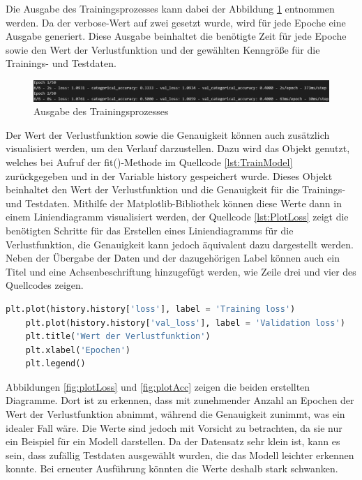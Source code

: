 Die Ausgabe des Trainingsprozesses kann dabei der Abbildung \ref*{fig:TrainModel} entnommen werden. Da der \glqq verbose\grqq{}-Wert auf zwei gesetzt wurde, wird für jede Epoche eine Ausgabe
generiert. Diese Ausgabe beinhaltet die benötigte Zeit für jede Epoche sowie den Wert der Verlustfunktion und der gewählten Kenngröße für die Trainings- und Testdaten.
\begin{figure}[H]
    \centering
    \includegraphics[width = \textwidth]{abbildungen/TrainAusgabe.png}
    \caption{Ausgabe des Trainingsprozesses}
    \label{fig:TrainModel}
\end{figure}
Der Wert der Verlustfunktion sowie die Genauigkeit können auch zusätzlich visualisiert werden, um den Verlauf darzustellen. Dazu wird das Objekt genutzt, welches bei Aufruf der 
fit()-Methode im Quellcode \ref*{lst:TrainModel} zurückgegeben und in der Variable \glqq history\grqq{} gespeichert wurde. Dieses Objekt beinhaltet 
den Wert der Verlustfunktion und die Genauigkeit für die Trainings- und Testdaten. Mithilfe der Matplotlib-Bibliothek können diese Werte dann in einem Liniendiagramm visualisiert werden,
der Quellcode \ref*{lst:PlotLoss} zeigt die benötigten Schritte für das Erstellen eines Liniendiagramms für die Verlustfunktion, die Genauigkeit kann jedoch äquivalent dazu 
dargestellt werden. Neben der Übergabe der Daten und der dazugehörigen Label können auch ein Titel und eine Achsenbeschriftung hinzugefügt werden, wie Zeile drei und vier des Quellcodes zeigen.
\begin{lstlisting}[language = python, caption={Trainieren des Modells},captionpos=b, label = lst:PlotLoss, float, floatplacement=H]
    plt.plot(history.history['loss'], label = 'Training loss')
    plt.plot(history.history['val_loss'], label = 'Validation loss')
    plt.title('Wert der Verlustfunktion')
    plt.xlabel('Epochen')
    plt.legend()
\end{lstlisting}
Abbildungen \ref*{fig:plotLoss} und \ref*{fig:plotAcc} zeigen die beiden erstellten Diagramme. Dort ist zu erkennen, dass mit zunehmender Anzahl an Epochen der Wert der Verlustfunktion abnimmt,
während die Genauigkeit zunimmt, was ein idealer Fall wäre. Die Werte sind jedoch mit Vorsicht zu betrachten, da sie nur ein Beispiel für ein Modell darstellen.
Da der Datensatz sehr klein ist, kann es sein, dass zufällig Testdaten ausgewählt wurden, die das Modell leichter erkennen konnte. Bei erneuter Ausführung könnten die 
Werte deshalb stark schwanken.

